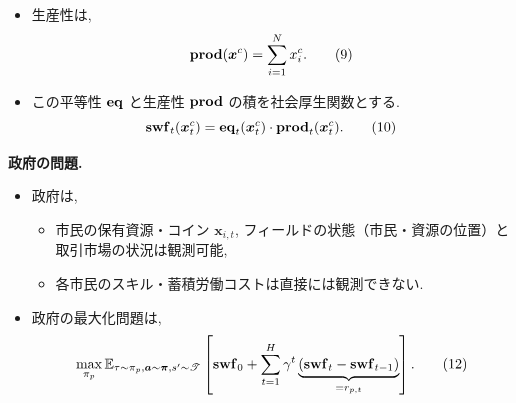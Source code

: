 \documentclass[unicode,aspectratio=169,11pt]{beamer}
\begin{document}
\begin{frame}{}{}
    \begin{itemize}
        \item 生産性は, 
        \[ {\bf prod}(\bm{x}^c) = \sum_{i=1}^N x_{i}^c. \tag{9} \]
        \item この平等性 ${\bf eq}$ と生産性 ${\bf prod}$ の積を社会厚生関数とする.%
        \[ {\bf swf}_t(\bm{x}_t^c) = {\bf eq}_t(\bm{x}_t^c) \cdot {\bf prod}_t (\bm{x}_t^c). \tag{10}\]
    \end{itemize}
\end{frame}

\begin{frame}{}{}
{\bf 政府の問題.}
\begin{itemize}
    \item 政府は,
    \begin{itemize}
        \item 市民の保有資源・コイン $\bm{x}_{i,t}$, フィールドの状態（市民・資源の位置）と取引市場の状況は観測可能,
        \item 各市民のスキル・蓄積労働コストは直接には観測できない.
    \end{itemize}
    \item 政府の最大化問題は,
    \[ \max_{\pi_p} \mathbb{E}_{\tau \sim \pi_p, \bm{a} \sim \bm{\pi}, s'\sim \mathscr{T}}\left[{\bf swf}_0+\sum_{t=1}^H\gamma^t\underbrace{({\bf swf}_t-{\bf swf}_{t-1})}_{=r_{p,t}}\right]. \tag{12} \]
\end{itemize}
\end{frame}
\end{document}
